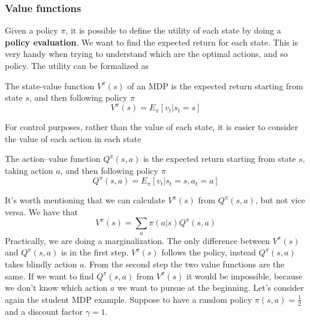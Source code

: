 \documentclass[../main.tex]{subfiles}
\begin{document}
\subsubsection{Value functions}
Given a policy $\pi$, it is possible to define the utility of each state by doing a \textbf{policy evaluation}. We want to find the expected return for each state. This is very handy when trying to understand which are the optimal actions, and so policy. The utility can be formalized as
\begin{definition}
    The state-value function $V^{\pi}(s)$ of an MDP is the expected return starting from state $s$, and then following policy $\pi$
    \begin{equation*}
        V^{\pi}(s) = E_{\pi}[v_t|s_t=s]
    \end{equation*}
\end{definition}
For control purposes, rather than the value of each state, it is easier to consider the value of each action in each state
\begin{definition}
    The action–value function $Q^\pi(s, a)$ is the expected return starting from state $s$, taking action $a$,
    and then following policy $\pi$
    \begin{equation*}
        Q^{\pi}(s,a) = E_{\pi}[v_t|s_t=s, a_t=a]
    \end{equation*}
\end{definition}
It's worth mentioning that we can calculate $V^{\pi}(s)$ from $Q^{\pi}(s, a)$, but not vice versa. We have that
\begin{equation}
    V^{\pi}(s) = \sum_a \pi(a|s) Q^{\pi}(s,a)
\end{equation}
Practically, we are doing a marginalization\footnotemark. The only difference between $V^{\pi}(s)$ and $Q^{\pi}(s, a)$ is in the first step. $V^{\pi}(s)$ follows the policy, instead $Q^{\pi}(s, a)$ takes blindly action $a$. From the second step the two value functions are the same. If we want to find $Q^{\pi}(s, a)$ from $V^{\pi}(s)$ it would be impossible, because we don't know which action $a$ we want to pursue at the beginning.
Let's consider again the student MDP example. Suppose to have a random policy $\pi(s,a)=\frac{1}{2}$ \footnotemark{} and a discount factor $\gamma=1$.
\end{document}

